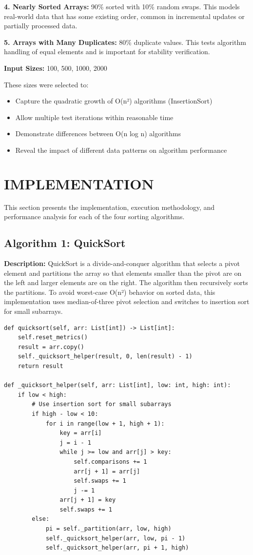 \documentclass[12pt]{article}
\begin{document}
\textbf{4. Nearly Sorted Arrays:} 90\% sorted with 10\% random swaps. This models real-world data that has some existing order, common in incremental updates or partially processed data.

\textbf{5. Arrays with Many Duplicates:} 80\% duplicate values. This tests algorithm handling of equal elements and is important for stability verification.

\textbf{Input Sizes:} 100, 500, 1000, 2000

These sizes were selected to:
\begin{itemize}
    \item Capture the quadratic growth of O(n²) algorithms (InsertionSort)
    \item Allow multiple test iterations within reasonable time
    \item Demonstrate differences between O(n log n) algorithms
    \item Reveal the impact of different data patterns on algorithm performance
\end{itemize}

\clearpage
\section{IMPLEMENTATION}

This section presents the implementation, execution methodology, and performance analysis for each of the four sorting algorithms.

\subsection{Algorithm 1: QuickSort}

\textbf{Description:} QuickSort is a divide-and-conquer algorithm that selects a pivot element and partitions the array so that elements smaller than the pivot are on the left and larger elements are on the right. The algorithm then recursively sorts the partitions. To avoid worst-case O(n²) behavior on sorted data, this implementation uses median-of-three pivot selection and switches to insertion sort for small subarrays.

\begin{lstlisting}[caption={QuickSort Implementation with Optimization}]
def quicksort(self, arr: List[int]) -> List[int]:
    self.reset_metrics()
    result = arr.copy()
    self._quicksort_helper(result, 0, len(result) - 1)
    return result

def _quicksort_helper(self, arr: List[int], low: int, high: int):
    if low < high:
        # Use insertion sort for small subarrays
        if high - low < 10:
            for i in range(low + 1, high + 1):
                key = arr[i]
                j = i - 1
                while j >= low and arr[j] > key:
                    self.comparisons += 1
                    arr[j + 1] = arr[j]
                    self.swaps += 1
                    j -= 1
                arr[j + 1] = key
                self.swaps += 1
        else:
            pi = self._partition(arr, low, high)
            self._quicksort_helper(arr, low, pi - 1)
            self._quicksort_helper(arr, pi + 1, high)
\end{lstlisting}
\end{document}
